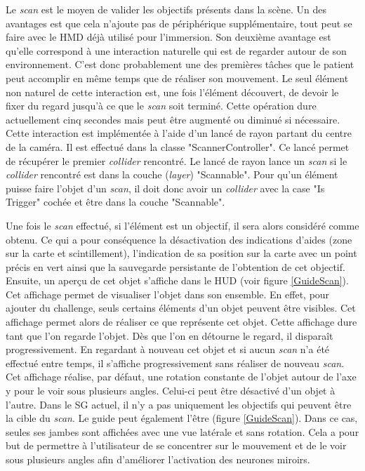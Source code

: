 		Le \textit{scan} est le moyen de valider les objectifs présents dans la scène. Un des avantages est que cela n'ajoute pas de périphérique supplémentaire, tout peut se faire avec le HMD déjà utilisé pour l'immersion. Son deuxième avantage est qu'elle correspond à une interaction naturelle qui est de regarder autour de son environnement. C'est donc probablement une des premières tâches que le patient peut accomplir en même temps que de réaliser son mouvement. Le seul élément non naturel de cette interaction est, une fois l'élément découvert, de devoir le fixer du regard jusqu'à ce que le \textit{scan} soit terminé. Cette opération dure actuellement cinq secondes mais peut être augmenté ou diminué si nécessaire.
		\\
		
		Cette interaction est implémentée à l'aide d'un lancé de rayon partant du centre de la caméra. Il est effectué dans la classe "ScannerController". Ce lancé permet de récupérer le premier \textit{collider} rencontré. Le lancé de rayon lance un \textit{scan} si le \textit{collider} rencontré est dans la couche (\textit{layer}) "Scannable". Pour qu'un élément puisse faire l'objet d'un \textit{scan}, il doit donc avoir un \textit{collider} avec la case "Is Trigger" cochée et être dans la couche "Scannable".
	
		Une fois le \textit{scan} effectué, si l'élément est un objectif, il sera alors considéré comme obtenu. Ce qui a pour conséquence la désactivation des indications d'aides (zone sur la carte et scintillement), l'indication de sa position sur la carte avec un point précis en vert ainsi que la sauvegarde persistante de l'obtention de cet objectif. Ensuite, un aperçu de cet objet s'affiche dans le HUD (voir figure \ref{GuideScan}). Cet affichage permet de visualiser l'objet dans son ensemble. En effet, pour ajouter du challenge, seuls certains éléments d'un objet peuvent être visibles. Cet affichage permet alors de réaliser ce que représente cet objet. Cette affichage dure tant que l'on regarde l'objet. Dès que l'on en détourne le regard, il disparaît progressivement. En regardant à nouveau cet objet et si aucun \textit{scan} n'a été effectué entre temps, il s'affiche progressivement sans réaliser de nouveau \textit{scan}. Cet affichage réalise, par défaut, une rotation constante de l'objet autour de l'axe y pour le voir sous plusieurs angles. Celui-ci peut être désactivé d'un objet à l'autre. Dans le SG actuel, il n'y a pas uniquement les objectifs qui peuvent être la cible du \textit{scan}. Le guide peut également l'être (figure \ref{GuideScan}). Dans ce cas, seules ses jambes sont affichées avec une vue latérale et sans rotation. Cela a pour but de permettre à l'utilisateur de se concentrer sur le mouvement et de le voir sous plusieurs angles afin d'améliorer l'activation des neurones miroirs.\medskip
		
